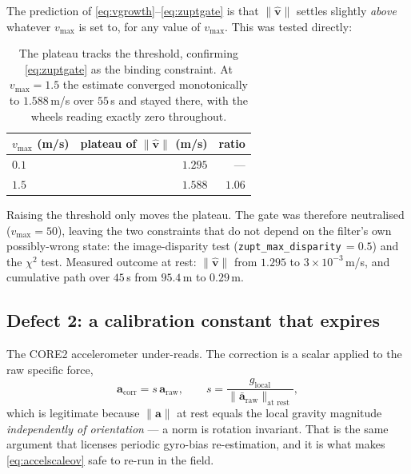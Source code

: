 The prediction of \eqref{eq:vgrowth}--\eqref{eq:zuptgate} is that
$\|\hat{\mathbf{v}}\|$ settles slightly \emph{above} whatever
$v_{\max}$ is set to, for any value of $v_{\max}$. This was tested directly:

\begin{table}[htbp]
\centering
\begin{tabular}{@{}lrr@{}}
\toprule
$v_{\max}$ (m/s) & plateau of $\|\hat{\mathbf{v}}\|$ (m/s) & ratio \\
\midrule
$0.1$  & $1.295$ & --- \\
$1.5$  & $1.588$ & $1.06$ \\
\bottomrule
\end{tabular}
\caption[ZUPT plateau versus threshold]{The plateau tracks the threshold,
confirming \eqref{eq:zuptgate} as the binding constraint. At $v_{\max}=1.5$
the estimate converged monotonically to $1.588$\,m/s over $55$\,s and stayed
there, with the wheels reading exactly zero throughout.}
\label{tab:zuptplateau}
\end{table}

Raising the threshold only moves the plateau. The gate was therefore
neutralised ($v_{\max}=50$), leaving the two constraints that do not depend on
the filter's own possibly-wrong state: the image-disparity test
(\texttt{zupt\_max\_disparity}$\,=0.5$) and the $\chi^2$ test. Measured
outcome at rest: $\|\hat{\mathbf{v}}\|$ from $1.295$ to
$3\times10^{-3}$\,m/s, and cumulative path over $45$\,s from $95.4$\,m to
$0.29$\,m.

\subsection{Defect 2: a calibration constant that expires}
\label{sec:accelexpire}

The CORE2 accelerometer under-reads. The correction is a scalar applied to the
raw specific force,
\begin{equation}
\mathbf{a}_{\mathrm{corr}} = s\,\mathbf{a}_{\mathrm{raw}},
\qquad
s = \frac{g_{\mathrm{local}}}{\|\bar{\mathbf{a}}_{\mathrm{raw}}\|_{\text{at rest}}},
\label{eq:accelscaleov}
\end{equation}
which is legitimate because $\|\mathbf{a}\|$ at rest equals the local gravity
magnitude \emph{independently of orientation} --- a norm is rotation
invariant. That is the same argument that licenses periodic gyro-bias
re-estimation, and it is what makes \eqref{eq:accelscaleov} safe to re-run in
the field.

